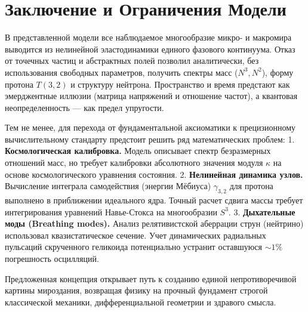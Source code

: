\documentclass[12pt,a4paper]{article}
\begin{document}
\section*{Заключение и Ограничения Модели}

В представленной модели все наблюдаемое многообразие микро- и макромира выводится из нелинейной эластодинамики единого фазового континуума. Отказ от точечных частиц и абстрактных полей позволил аналитически, без использования свободных параметров, получить спектры масс ($N^3, N^2$), форму протона $T(3,2)$ и структуру нейтрона. Пространство и время предстают как эмерджентные иллюзии (матрица напряжений и отношение частот), а квантовая неопределенность — как предел упругости.

Тем не менее, для перехода от фундаментальной аксиоматики к прецизионному вычислительному стандарту предстоит решить ряд математических проблем:
1. \textbf{Космологическая калибровка.} Модель описывает спектр безразмерных отношений масс, но требует калибровки абсолютного значения модуля $\kappa$ на основе космологического уравнения состояния.
2. \textbf{Нелинейная динамика узлов.} Вычисление интеграла самодействия (энергии Мёбиуса) $\gamma_{3,2}$ для протона выполнено в приближении идеального ядра. Точный расчет сдвига массы требует интегрирования уравнений Навье-Стокса на многообразии $S^3$.
3. \textbf{Дыхательные моды (Breathing modes).} Анализ релятивистской аберрации струн (нейтрино) использовал квазистатическое сечение. Учет динамических радиальных пульсаций скрученного геликоида потенциально устранит оставшуюся $\sim 1\%$ погрешность осцилляций.

Предложенная концепция открывает путь к созданию единой непротиворечивой картины мироздания, возвращая физику на прочный фундамент строгой классической механики, дифференциальной геометрии и здравого смысла.
	
\end{document}
